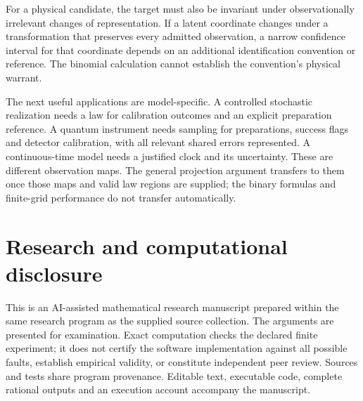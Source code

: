 \documentclass[11pt,a4paper]{article}
\theoremstyle{definition}\newtheorem{definition}[theorem]{Definition}
\begin{document}
For a physical candidate, the target must also be invariant under observationally irrelevant changes of representation. If a latent coordinate changes under a transformation that preserves every admitted observation, a narrow confidence interval for that coordinate depends on an additional identification convention or reference. The binomial calculation cannot establish the convention's physical warrant.

The next useful applications are model-specific. A controlled stochastic realization needs a law for calibration outcomes and an explicit preparation reference. A quantum instrument needs sampling for preparations, success flags and detector calibration, with all relevant shared errors represented. A continuous-time model needs a justified clock and its uncertainty. These are different observation maps. The general projection argument transfers to them once those maps and valid law regions are supplied; the binary formulas and finite-grid performance do not transfer automatically.



\section*{Research and computational disclosure}
This is an AI-assisted mathematical research manuscript prepared within the same research program as the supplied source collection. The arguments are presented for examination. Exact computation checks the declared finite experiment; it does not certify the software implementation against all possible faults, establish empirical validity, or constitute independent peer review. Sources and tests share program provenance. Editable text, executable code, complete rational outputs and an execution account accompany the manuscript.
\end{document}
